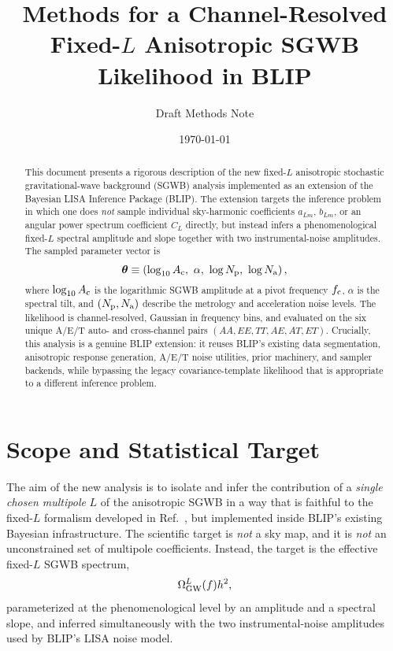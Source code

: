 \documentclass[11pt]{article}
\title{Methods for a Channel-Resolved Fixed-$L$ Anisotropic SGWB Likelihood in BLIP}
\author{Draft Methods Note}
\date{\today}
\newcommand{\OmL}{\Omega_{\rm GW}^{L}}
\newcommand{\fc}{f_{\rm c}}
\newcommand{\vect}[1]{\bm{#1}}
\begin{document}
\maketitle

\begin{abstract}
This document presents a rigorous description of the new fixed-$L$ anisotropic stochastic gravitational-wave background (SGWB) analysis implemented as an extension of the Bayesian LISA Inference Package (BLIP).  The extension targets the inference problem in which one does \emph{not} sample individual sky-harmonic coefficients $a_{Lm}$, $b_{Lm}$, or an angular power spectrum coefficient $C_L$ directly, but instead infers a phenomenological fixed-$L$ spectral amplitude and slope together with two instrumental-noise amplitudes.  The sampled parameter vector is
\begin{equation}
  \vect{\theta} \equiv \left(\log_{10}A_{\rm c},\ \alpha,\ \log N_{\rm p},\ \log N_{\rm a}\right),
\end{equation}
where $\log_{10}A_{\rm c}$ is the logarithmic SGWB amplitude at a pivot frequency $\fc$, $\alpha$ is the spectral tilt, and $(N_{\rm p},N_{\rm a})$ describe the metrology and acceleration noise levels.  The likelihood is channel-resolved, Gaussian in frequency bins, and evaluated on the six unique A/E/T auto- and cross-channel pairs $(AA,EE,TT,AE,AT,ET)$.  Crucially, this analysis is a genuine BLIP extension: it reuses BLIP's existing data segmentation, anisotropic response generation, A/E/T noise utilities, prior machinery, and sampler backends, while bypassing the legacy covariance-template likelihood that is appropriate to a different inference problem.
\end{abstract}

\tableofcontents

\section{Scope and Statistical Target}

The aim of the new analysis is to isolate and infer the contribution of a \emph{single chosen multipole} $L$ of the anisotropic SGWB in a way that is faithful to the fixed-$L$ formalism developed in Ref.~\cite{LISAAnisotropyPaper}, but implemented inside BLIP's existing Bayesian infrastructure.  The scientific target is \emph{not} a sky map, and it is \emph{not} an unconstrained set of multipole coefficients.  Instead, the target is the effective fixed-$L$ SGWB spectrum,
\begin{equation}
  \OmL(f)h^2,
\end{equation}
parameterized at the phenomenological level by an amplitude and a spectral slope, and inferred simultaneously with the two instrumental-noise amplitudes used by BLIP's LISA noise model.
\end{document}
